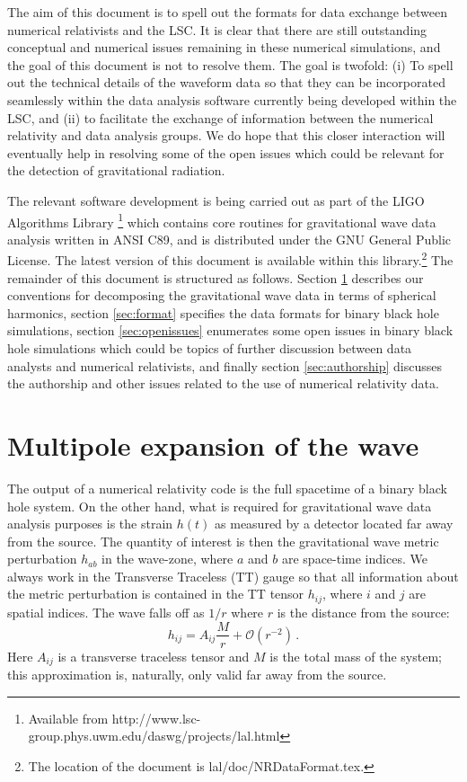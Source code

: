 \documentclass[10pt]{ligodcc}
\renewcommand{\texttt}[1]{{\ttfamily\color{blue}#1}}
\begin{document}
The aim of this document is to spell out the formats for data exchange
between numerical relativists and the LSC.  It is clear that there are
still outstanding conceptual and numerical issues remaining in these
numerical simulations, and the goal of this document is not to resolve
them.  The goal is twofold: (i) To spell out the technical details of
the waveform data so that they can be incorporated seamlessly within
the data analysis software currently being developed within the LSC,
and (ii) to facilitate the exchange of information between the
numerical relativity and data analysis groups.  We do hope that this
closer interaction will eventually help in resolving some of the open
issues which could be relevant for the detection of gravitational
radiation.

The relevant software development is being carried out as part of the
LIGO Algorithms Library \footnote{Available from
  \texttt{http://www.lsc-group.phys.uwm.edu/daswg/projects/lal.html}}
which contains core routines for gravitational wave data analysis
written in ANSI C89, and is distributed under the GNU General Public
License.  The latest version of this document is available within this
library.\footnote{The location of the document is
  \texttt{lal/doc/NRDataFormat.tex}.}  The remainder of this document
is structured as follows.  Section \ref{sec:multipoles} describes our
conventions for decomposing the gravitational wave data in terms of
spherical harmonics, section \ref{sec:format} specifies the data
formats for binary black hole simulations, section
\ref{sec:openissues} enumerates some open issues in binary black hole
simulations which could be topics of further discussion between data
analysts and numerical relativists, and finally section
\ref{sec:authorship} discusses the authorship and other issues related
to the use of numerical relativity data.



\section{Multipole expansion of the wave}
\label{sec:multipoles}


The output of a numerical relativity code is the full spacetime of a
binary black hole system. On the other hand, what is required for
gravitational wave data analysis purposes is the strain $h(t)$ as
measured by a detector located far away from the source.  The quantity
of interest is then the gravitational wave metric perturbation
$h_{ab}$ in the wave-zone, where $a$ and $b$ are space-time indices.
We always work in the Transverse Traceless (TT) gauge so that all
information about the metric perturbation is contained in the TT
tensor $h_{ij}$, where $i$ and $j$ are spatial indices.  The wave
falls off as $1/r$ where $r$ is the distance from the source:
\begin{equation}
  \label{eq:1}
  h_{ij} = A_{ij}\frac{M}{r} + \mathcal{O}\left(r^{-2}\right)\,.
\end{equation}
Here $A_{ij}$ is a transverse traceless tensor and $M$ is the total
mass of the system; this approximation is, naturally, only valid far
away from the source.
\end{document}
